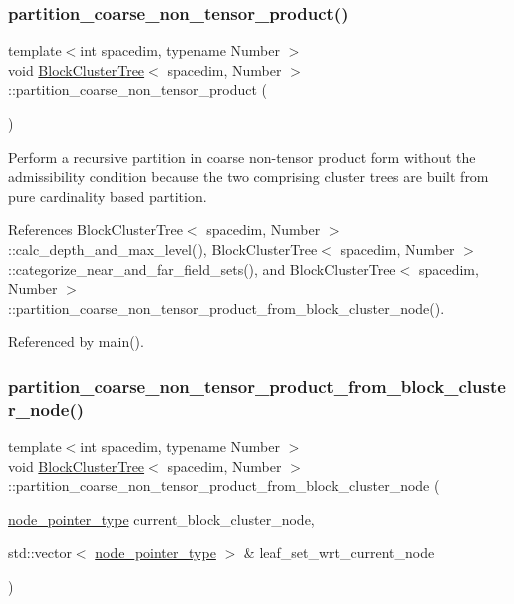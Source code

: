 \subsubsection{\texorpdfstring{partition\+\_\+coarse\+\_\+non\+\_\+tensor\+\_\+product()}{partition\_coarse\_non\_tensor\_product()}}
{\footnotesize\ttfamily template$<$int spacedim, typename Number $>$ \\
void \hyperlink{classBlockClusterTree}{Block\+Cluster\+Tree}$<$ spacedim, Number $>$\+::partition\+\_\+coarse\+\_\+non\+\_\+tensor\+\_\+product (\begin{DoxyParamCaption}{ }\end{DoxyParamCaption})}

Perform a recursive partition in coarse non-\/tensor product form without the admissibility condition because the two comprising cluster trees are built from pure cardinality based partition. 

References Block\+Cluster\+Tree$<$ spacedim, Number $>$\+::calc\+\_\+depth\+\_\+and\+\_\+max\+\_\+level(), Block\+Cluster\+Tree$<$ spacedim, Number $>$\+::categorize\+\_\+near\+\_\+and\+\_\+far\+\_\+field\+\_\+sets(), and Block\+Cluster\+Tree$<$ spacedim, Number $>$\+::partition\+\_\+coarse\+\_\+non\+\_\+tensor\+\_\+product\+\_\+from\+\_\+block\+\_\+cluster\+\_\+node().



Referenced by main().

\mbox{\label{classBlockClusterTree_a61b6c204f3f1d5ff7c71a07b26ca9d09}} 
\subsubsection{\texorpdfstring{partition\+\_\+coarse\+\_\+non\+\_\+tensor\+\_\+product\+\_\+from\+\_\+block\+\_\+cluster\+\_\+node()}{partition\_coarse\_non\_tensor\_product\_from\_block\_cluster\_node()}}
{\footnotesize\ttfamily template$<$int spacedim, typename Number $>$ \\
void \hyperlink{classBlockClusterTree}{Block\+Cluster\+Tree}$<$ spacedim, Number $>$\+::partition\+\_\+coarse\+\_\+non\+\_\+tensor\+\_\+product\+\_\+from\+\_\+block\+\_\+cluster\+\_\+node (\begin{DoxyParamCaption}\item[{\hyperlink{classTreeNode}{node\+\_\+pointer\+\_\+type}}]{current\+\_\+block\+\_\+cluster\+\_\+node,  }\item[{std\+::vector$<$ \hyperlink{classTreeNode}{node\+\_\+pointer\+\_\+type} $>$ \&}]{leaf\+\_\+set\+\_\+wrt\+\_\+current\+\_\+node }\end{DoxyParamCaption})\hspace{0.3cm}{\ttfamily [private]}}

